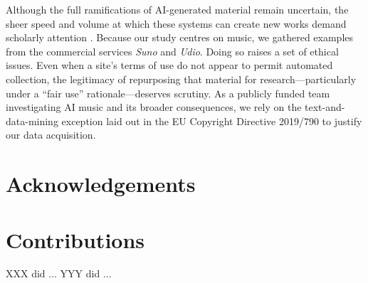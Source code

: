 \documentclass{article}
\begin{document}
Although the full ramifications of AI-generated material remain uncertain, the sheer speed and volume at which these systems can create new works demand scholarly attention \citep{Sturm2024a,pelly2025mood}. Because our study centres on music, we gathered examples from the commercial services {\em Suno} and {\em Udio}. Doing so raises a set of ethical issues. Even when a site’s terms of use do not appear to permit automated collection, the legitimacy of repurposing that material for research—particularly under a “fair use” rationale—deserves scrutiny. As a publicly funded team investigating AI music and its broader consequences, we rely on the text-and-data-mining exception laid out in the EU Copyright Directive 2019/790 \citep{EUDirective2019} to justify our data acquisition.

\section*{Acknowledgements}


\section*{Contributions}
XXX did ... YYY did ... 



%
%
%
%
\end{document}
